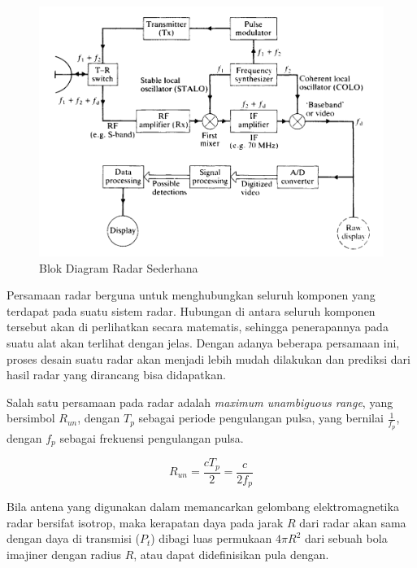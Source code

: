  \begin{figure}
	\begin{center}
		\includegraphics[scale=0.35]{pics/bab2/blokdiagram.png} 
		\caption[Blok Diagram Radar]{{Blok Diagram Radar Sederhana \cite{Kingsley1999}}}
		\label{pic:blokdiagram}
	\end{center}
\end{figure}

Persamaan radar berguna untuk menghubungkan seluruh komponen yang terdapat pada suatu sistem radar. Hubungan di antara seluruh komponen tersebut akan di perlihatkan secara matematis, sehingga penerapannya pada suatu alat akan terlihat dengan jelas. Dengan adanya beberapa persamaan ini, proses desain suatu radar akan menjadi lebih mudah dilakukan dan prediksi dari hasil radar yang dirancang bisa didapatkan.

Salah satu persamaan pada radar adalah \textit{maximum unambiguous range}, yang bersimbol $R_{un}$, dengan $T_{p}$ sebagai periode pengulangan pulsa, yang bernilai $\frac{1}{f_{p}}$, dengan $f_{p}$ sebagai frekuensi pengulangan pulsa.

\begin{equation}
	R_{un} = \frac{cT_{p}}{2} = \frac{c}{2f_{p}}
\end{equation}

Bila antena yang digunakan dalam memancarkan gelombang elektromagnetika radar bersifat isotrop, maka kerapatan daya pada jarak $R$ dari radar akan sama dengan daya di transmisi ($P_{t}$) dibagi luas permukaan $4\pi R^{2}$ dari sebuah bola imajiner dengan radius $R$, atau dapat didefinisikan pula dengan.

